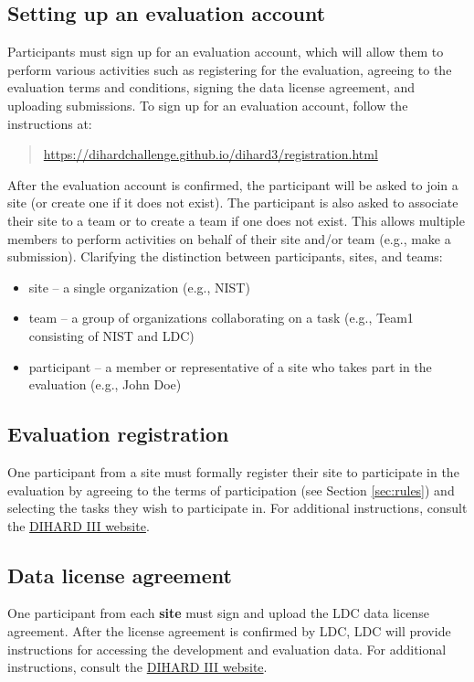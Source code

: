 \documentclass{article}
\begin{document}
\subsection{Setting up an evaluation account}
Participants must sign up for an evaluation account, which will allow them to perform various activities such as registering for the evaluation, agreeing to the evaluation terms and conditions, signing the data license agreement, and uploading submissions. To sign up for an evaluation account, follow the instructions at: 
    \begin{quote}
        \url{https://dihardchallenge.github.io/dihard3/registration.html}
    \end{quote}
After the evaluation account is confirmed, the participant will be asked to join a site (or create one if it does not exist). The participant is also asked to associate their site to a team or to create a team if one does not exist. This allows multiple members to perform activities on behalf of their site and/or team (e.g., make a submission). Clarifying the distinction between participants, sites, and teams:
    \begin{itemize}
        \item site  --   a single organization (e.g., NIST)
        \item team  --  a group of organizations collaborating on a task (e.g., Team1 consisting of NIST and LDC)
        \item participant  --  a member or representative of a site who takes part in the evaluation (e.g., John Doe)
    \end{itemize}


\subsection{Evaluation registration}
One participant from a site must formally register their site to participate in the evaluation by agreeing to the terms of participation (see Section \ref{sec:rules}) and selecting the tasks they wish to participate in. 
For additional instructions, consult the \href{https://dihardchallenge.github.io/dihard3/registration.html}{DIHARD III website}.


\subsection{Data license agreement}
One participant from each {\bf site} must sign and upload the LDC data license agreement. After the license agreement is confirmed by LDC, LDC will provide instructions for accessing the development and evaluation data. For additional instructions, consult the \href{https://dihardchallenge.github.io/dihard3/registration.html}{DIHARD III website}.
\end{document}
